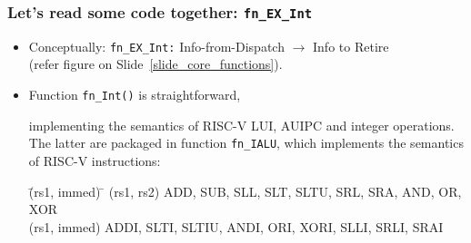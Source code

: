 \begin{frame}[fragile]
\frametitle{Let's read some code together: {\tt fn\_EX\_Int}}

\begin{center}\scriptsize


 \vspace{1ex}

 \begin{minipage}{0.8\textwidth}
  \begin{itemize}

   \item Conceptually: {\tt fn\_EX\_Int:} Info-from-Dispatch $\rightarrow$ Info to Retire\\
     (refer figure on Slide~\ref{slide_core_functions}).

   \item Function {\tt fn\_Int()} is straightforward,

     implementing the semantics of RISC-V LUI, AUIPC and integer
     operations.  The latter are packaged in function {\tt fn\_IALU},
     which implements the semantics of RISC-V instructions:
     \begin{tabbing}
      \hmm \= (rs1, immed) \hm \= \kill
      \hmm \> (rs1, rs2) \hm   \> ADD, SUB, SLL, SLT, SLTU, SRL, SRA, AND, OR, XOR \\
      \hmm \> (rs1, immed)     \> ADDI, SLTI, SLTIU, ANDI, ORI, XORI, SLLI, SRLI, SRAI
     \end{tabbing}
  \end{itemize}

 \end{minipage}
\end{center}

\end{frame}

